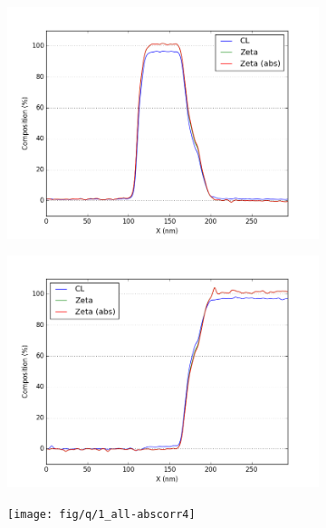 \begin{figure}
\begin{subfigure}{.5\textwidth}
		\caption{}
		\label{fig:zeta_area1_as}
	\end{subfigure}
		\begin{subfigure}{.5\textwidth}
			\centering
			\includegraphics[width=\linewidth]{fig/q/1_pd_nm}
			\caption{}
			\label{fig:zeta_area1_pd}
		\end{subfigure}%
		\begin{subfigure}{.5\textwidth}
			\centering
			\includegraphics[width=\linewidth]{fig/q/1_ge_nm}
			\caption{}
			\label{fig:zeta_area1_ge}
	\end{subfigure}
		\begin{subfigure}{.5\textwidth}
			\centering
			\texttt{[image: fig/q/1\_all-abscorr4]}
			\caption{}
			\label{fig:zeta_area1_all}

\end{subfigure}
\end{figure}
